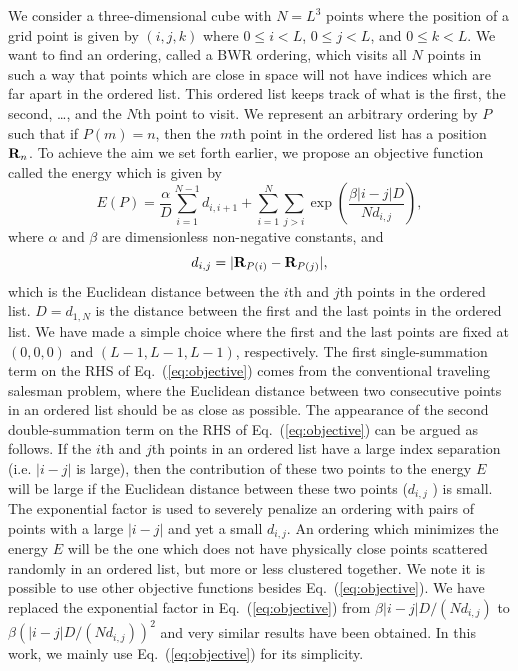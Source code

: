 \documentclass[preprint,showpacs,amssymb,aps]{revtex4}
\begin{document}
We consider a three-dimensional cube with $ N = L^3$ points where the position
of a grid point is given by
$(i,j,k)$ where $ 0 \le i < L$, $0 \le j < L$, and $0 \le k < L$.
We want to find an ordering, called a BWR ordering,
which visits all $N$ points in such a way that
points which are close in space will not have indices which are far apart
in the ordered list. This ordered list keeps track of
what is the first, the second, \ldots, and the $N$th point to visit.
We represent an arbitrary ordering by $P$ such that if
$P(m) = n$, then the $m$th point in the ordered list has a position
${\bf R}_n$. 
To achieve the aim we set forth earlier,
we propose an objective function called the energy which is given by
\begin{equation}
E({P}) = \frac{\alpha}{D} \sum_{i=1}^{N-1} d_{i,i+1}
+ \sum_{i=1}^{N}\sum_{j>i}
 \exp{\left( \frac{\beta |i-j| D}{N d_{i,j}}\right)},
\label{eq:objective}
\end{equation}
where $\alpha$ and $\beta$ are dimensionless non-negative constants, and
\begin{equation}
d_{i,j} = | {\bf R}_{P(i)} - {\bf R}_{P(j)} | ,
\end{equation}
which is the Euclidean distance 
between the $i$th and $j$th points in the ordered list.
$D = d_{1,N}$
is the distance between the first and the last points in the ordered 
list. We have made a simple
choice where the first and the last points
are fixed at $(0,0,0)$ and $(L-1,L-1,L-1)$, respectively.
The first single-summation 
term on the RHS of Eq.~(\ref{eq:objective})
comes from the conventional 
traveling salesman problem\cite{Press_86}, 
where the Euclidean distance between two consecutive points in an ordered list
should be as close as possible. 
The appearance of the second 
double-summation term on the RHS of Eq.~(\ref{eq:objective})
can be argued as follows. If the $i$th and $j$th points in an ordered list
have a large index separation (i.e. 
$|i-j|$ is large),
then the contribution of these two points to the energy $E$
will be large if the 
Euclidean distance between these two points ($d_{i,j}$ ) is
small. The exponential factor is used to severely penalize an ordering
with pairs of points with a large $|i-j|$ and yet a small $d_{i,j}$. 
An ordering which minimizes the energy $E$ 
will be the one which does not have physically close 
points scattered randomly in an ordered list, but more or less clustered 
together.
We note it is possible to use other objective functions besides
Eq.~(\ref{eq:objective}). 
We have replaced the exponential factor in Eq.~(\ref{eq:objective}) 
from $\beta|i-j|D/(N d_{i,j})$ to $\beta(|i-j|D/(N d_{i,j}))^2$ and
very similar results have been obtained.
In this work, we mainly use Eq.~(\ref{eq:objective}) for its simplicity.
\end{document}
